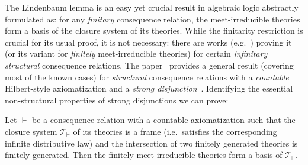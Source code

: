 \documentclass[bsl,meeting]{asl}
\newcommand{\NP}{}
\begin{document}
\thispagestyle{empty}
\thispagestyle{empty}




\NP
{}



The Lindenbaum lemma is an easy yet crucial result in algebraic logic abstractly formulated as: for any \emph{finitary} consequence relation, the meet-irreducible theories form a basis of the closure system of its theories. While the finitarity restriction is crucial for its usual proof, it is not necessary: there are works (e.g.\ \cite{Goldblatt93,Segerberg94,Sundholm77}) proving it (or its variant for \emph{finitely} meet-irreducible theories) for certain \emph{infinitary structural} consequence relations. The paper~\cite{Bilkova-Cintula-Lavicka:InfinitaryWOLLIC} provides a general result (covering most of the known cases) for \emph{structural} consequence relations with a \emph{countable} Hilbert-style axiomatization and a \emph{strong disjunction}~\cite{CN:TheBook}. Identifying the essential non-structural properties of strong disjunctions we can prove:

\smallskip

 Let $\vdash$ be a consequence relation with a countable axiomatization such that the closure system $\mathcal T_\vdash$ of its theories is a frame (i.e.\ satisfies the corresponding infinite distributive law) and the intersection of two finitely generated theories is finitely generated. Then the finitely meet-irreducible theories form a basis of $\mathcal T_\vdash$.


\end{document}
